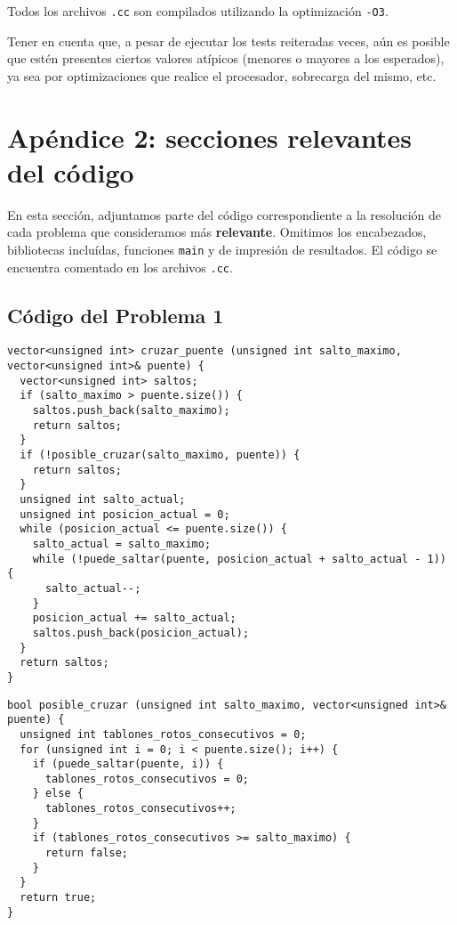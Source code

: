 \documentclass[a4paper]{article}
\begin{document}
Todos los archivos \verb|.cc| son compilados utilizando la optimización \verb|-O3|. \medskip

Tener en cuenta que, a pesar de ejecutar los tests reiteradas veces, aún es posible que estén presentes ciertos
valores atípicos (menores o mayores a los esperados), ya sea por optimizaciones que realice el procesador, sobrecarga
del mismo, etc.
\newpage

\section{Apéndice 2: secciones relevantes del código}
En esta sección, adjuntamos parte del código correspondiente a la resolución de cada problema
que consideramos más \textbf{relevante}. Omitimos los encabezados, bibliotecas incluídas,
funciones \verb|main| y de impresión de resultados. El código se encuentra comentado en los
archivos \verb|.cc|.

\subsection{Código del Problema 1}



\begin{lstlisting}
vector<unsigned int> cruzar_puente (unsigned int salto_maximo, vector<unsigned int>& puente) {
  vector<unsigned int> saltos;
  if (salto_maximo > puente.size()) {
    saltos.push_back(salto_maximo);
    return saltos;
  }
  if (!posible_cruzar(salto_maximo, puente)) {
    return saltos;
  }
  unsigned int salto_actual;
  unsigned int posicion_actual = 0;
  while (posicion_actual <= puente.size()) {
    salto_actual = salto_maximo;
    while (!puede_saltar(puente, posicion_actual + salto_actual - 1)) {
      salto_actual--;
    }
    posicion_actual += salto_actual;
    saltos.push_back(posicion_actual);
  }
  return saltos;
}
\end{lstlisting}

\vspace*{0.5cm}

\begin{lstlisting}
bool posible_cruzar (unsigned int salto_maximo, vector<unsigned int>& puente) {
  unsigned int tablones_rotos_consecutivos = 0;
  for (unsigned int i = 0; i < puente.size(); i++) {
    if (puede_saltar(puente, i)) {
      tablones_rotos_consecutivos = 0;
    } else {
      tablones_rotos_consecutivos++;
    }
    if (tablones_rotos_consecutivos >= salto_maximo) {
      return false;
    }
  }
  return true;
}
\end{lstlisting}
\end{document}
